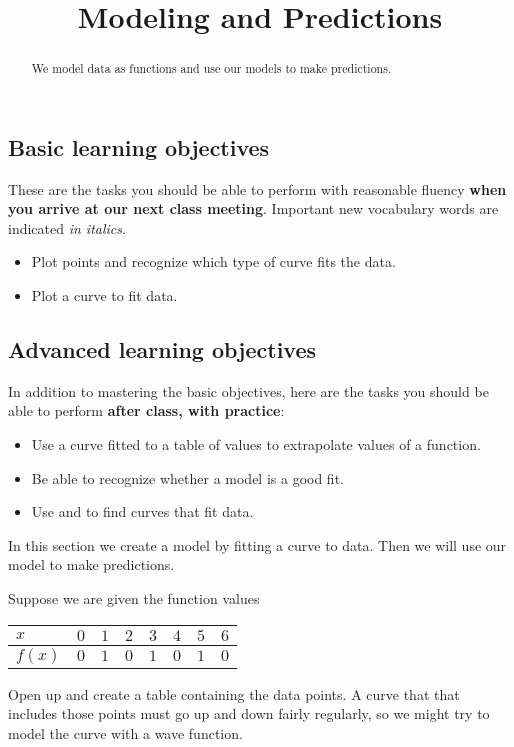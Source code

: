 \documentclass{ximera}
\title{Modeling and Predictions}
\begin{document}
\begin{abstract}
We model data as functions and use our models to make predictions.
\end{abstract}
\maketitle

\subsection*{Basic learning objectives}

These are the tasks you should be able to perform with reasonable fluency \textbf{when you arrive at our next class meeting}. Important new vocabulary words are indicated \emph{in italics}. 

\begin{itemize}
	\item Plot points and recognize which type of curve fits the data.
	\item Plot a curve to fit data.
\end{itemize}

\subsection*{Advanced learning objectives}

In addition to mastering the basic objectives, here are the tasks you should be able to perform \textbf{after class, with practice}: 

\begin{itemize}
	\item Use a curve fitted to a table of values to extrapolate values of a function.
    \item Be able to recognize whether a model is a good fit.
    \item Use  and  to find curves that fit data.
\end{itemize}

\noindent\hrulefill

In this section we create a model by fitting a curve to data. Then we will use our model to make predictions.

Suppose we are given the function values 
\begin{center} 
    \begin{tabular}{llllllll}
    $x$  & $0$ & $1$ & $2$ & $3$ & $4$ & $5$ & $6$ \\ \hline
    $f(x)$ & $0$ & $1$ & $0$ & $1$ & $0$ & $1$ & $0$ \\
    \end{tabular}
\end{center}
Open up  and create a table containing the data points. A curve that that includes those points must go up and down fairly regularly, so we might try to model the curve with a wave function.
\end{document}

